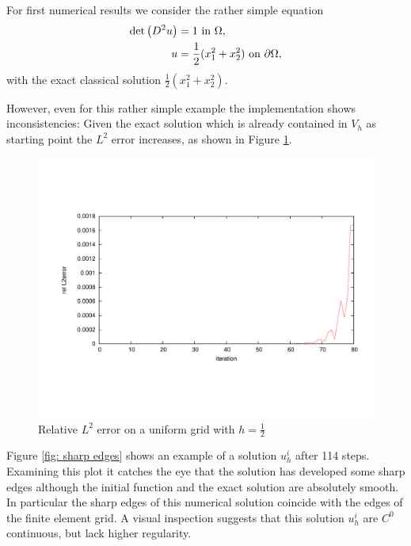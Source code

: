 For first numerical results we consider the rather simple equation
\begin{align}
	\det{\left(D^2 u\right)} &= 1 \text{ in } \Omega, \\ 
	u &= \frac 1 2 (x_1^2 + x_2^2 )\text{ on }\partial \Omega,
\end{align}
with the exact classical solution $\frac 1 2 (x_1^2 + x_2^2 )$. 

However, even for this rather simple example the implementation shows inconsistencies: Given the exact solution which is already contained in $V_h$ as starting point the $L^2$ error increases, as shown in Figure \ref{fig: consisctency_first_try}.

\begin{figure}[H]
	\centering
	\includegraphics[trim = 2cm 4cm 1cm 4cm, scale =0.5]{plots/consisctency_first_try.pdf}
	\caption{Relative $L^2$ error on a uniform grid with $h=\frac 1 2$}
	\label{fig: consisctency_first_try}
\end{figure}

Figure \ref{fig: sharp edges} shows an example of a solution $u^i_h$ after 114 steps. Examining this plot it catches the eye that the solution has developed some sharp edges although the initial function and the exact solution are absolutely smooth. In particular the sharp edges of this numerical solution coincide with the edges of the finite element grid. A visual inspection suggests that this solution $u^i_h$ are $C^0$ continuous, but lack higher regularity.

